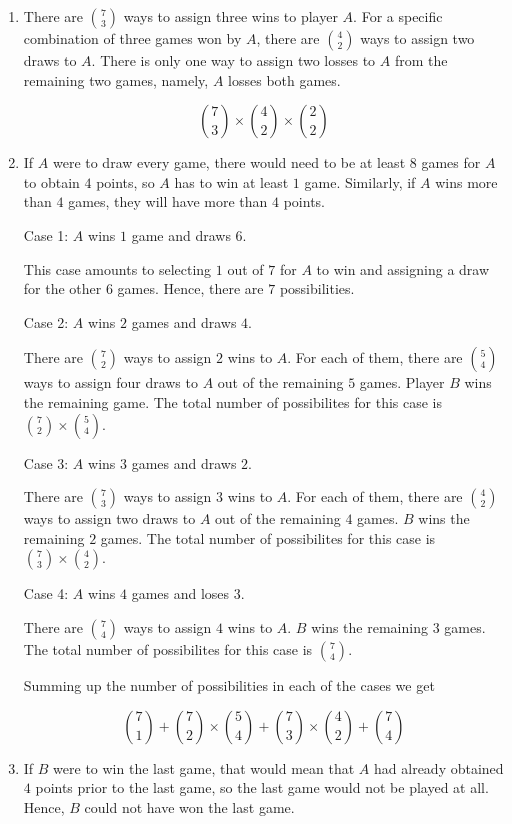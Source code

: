 \begin{enumerate}[label=(\alph*)]
\item There are ${7 \choose 3}$ ways to assign three wins to player $A$. For a 
specific combination of three games won by $A$, there are ${4 \choose 2}$ ways 
to assign two draws to $A$. There is only one way to assign two losses to $A$ 
from the remaining two games, namely, $A$ losses both games.

  $$ {7 \choose 3} \times {4 \choose 2} \times {2 \choose 2} $$

\item   If $A$ were to draw every game, there would need to be at least $8$ 
games for $A$ to obtain $4$ points, so $A$ has to win at least $1$ game. 
Similarly, if $A$ wins more than $4$ games, they will have more than $4$ points.
  
  Case 1: $A$ wins $1$ game and draws $6$.
  
  This case amounts to selecting $1$ out of $7$ for $A$ to win and assigning a 
  draw for the other $6$ games. Hence, there are $7$ possibilities.
    
  Case 2: $A$ wins $2$ games and draws $4$.
  
  There are ${7 \choose 2}$ ways to assign $2$ wins to $A$. For each of them, 
  there are ${5 \choose 4}$ ways to assign four draws to $A$ out of the 
  remaining $5$ games. Player $B$ wins the remaining game. The total number 
  of possibilites for this case is ${7 \choose 2} \times {5 \choose 4}$.
  
  Case 3: $A$ wins $3$ games and draws $2$.
  
  There are ${7 \choose 3}$ ways to assign $3$ wins to $A$. For each of them, 
  there are ${4 \choose 2}$ ways to assign two draws to $A$ out of the remaining 
  $4$ games. $B$ wins the remaining $2$ games. The total number of possibilites 
  for this case is ${7 \choose 3} \times {4 \choose 2}$.
  
  Case 4: $A$ wins $4$ games and loses $3$.
  
  There are ${7 \choose 4}$ ways to assign $4$ wins to $A$. $B$ wins the 
  remaining $3$ games.
  The total number of possibilites for this case is ${7 \choose 4}$.
  
  Summing up the number of possibilities in each of the cases we get
  
  $$ {7 \choose 1} + {7 \choose 2} \times {5 \choose 4} + {7 \choose 3} \times 
  {4 \choose 2} + {7 \choose 4} $$

\item If $B$ were to win the last game, that would mean that $A$ had already 
obtained $4$ points prior to the last game, so the last game would not be 
played at all. Hence, $B$ could not have won the last game.
  

\end{enumerate}
